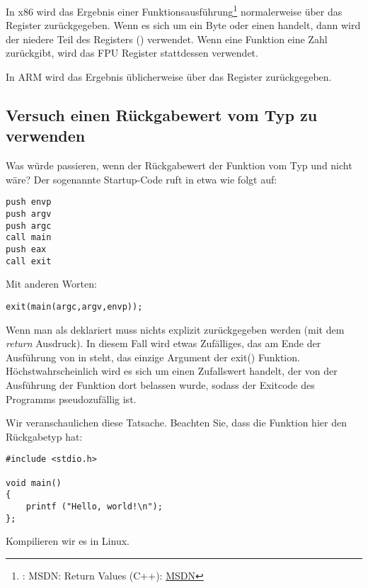 
In x86 wird das Ergebnis einer Funktionsausführung\footnote{\Seealso: MSDN: Return Values (C++):
\href{http://go.yurichev.com/17258}{MSDN}} normalerweise über das \EAX Register zurückgegeben.
Wenn es sich um ein Byte oder einen \Tchar handelt, dann wird der niedere Teil des Registers \EAX (\AL) verwendet.
Wenn eine Funktion eine \Tfloat Zahl zurückgibt, wird das FPU Register  stattdessen verwendet.

In ARM wird das Ergebnis üblicherweise über das  Register zurückgegeben.

\subsection{Versuch einen Rückgabewert vom Typ \Tvoid zu verwenden}
\label{UseResultOfVoidFunc}

Was würde passieren, wenn der Rückgabewert der Funktion \main vom Typ \Tvoid und nicht \Tint wäre?
Der sogenannte Startup-Code ruft \main in etwa wie folgt auf:

\begin{lstlisting}[style=customasmx86]
push envp
push argv
push argc
call main
push eax
call exit
\end{lstlisting}

Mit anderen Worten:

\begin{lstlisting}[style=customc]
exit(main(argc,argv,envp));
\end{lstlisting}
Wenn man \main als \Tvoid deklariert muss nichts explizit zurückgegeben werden (mit dem \emph{return} Ausdruck). In diesem
Fall wird etwas Zufälliges, das am Ende der Ausführung von \main in \EAX steht, das einzige Argument der exit()
Funktion.
Höchstwahrscheinlich wird es sich um einen Zufallswert handelt, der von der Ausführung der Funktion dort belassen wurde,
sodass der Exitcode des Programms pseudozufällig ist.
\par
Wir veranschaulichen diese Tatsache. 
Beachten Sie, dass die Funktion \main hier den Rückgabetyp \Tvoid hat: 

\begin{lstlisting}[style=customc]
#include <stdio.h>

void main()
{
	printf ("Hello, world!\n");
};
\end{lstlisting}

Kompilieren wir es in Linux.

